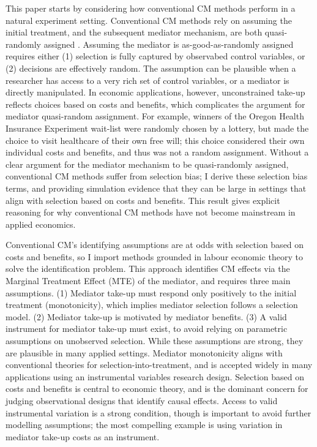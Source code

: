 This paper starts by considering how conventional CM methods perform in a natural experiment setting.
Conventional CM methods rely on assuming the initial treatment, and the subsequent mediator mechanism, are both quasi-randomly assigned \citep{imai2010identification}.
Assuming the mediator is as-good-as-randomly assigned requires either (1) selection is fully captured by observabed control variables, or (2) decisions are effectively random.
The assumption can be plausible when a researcher has access to a very rich set of control variables, or a mediator is directly manipulated.
In economic applications, however, unconstrained take-up reflects choices based on costs and benefits, which complicates the argument for mediator quasi-random assignment.
For example, winners of the Oregon Health Insurance Experiment wait-list were randomly chosen by a lottery, but made the choice to visit healthcare of their own free will; this choice considered their own individual costs and benefits, and thus was not a random assignment.
Without a clear argument for the mediator mechanism to be quasi-randomly assigned, conventional CM methods suffer from selection bias; I derive these selection bias terms, and providing simulation evidence that they can be large in settings that align with selection based on costs and benefits.
This result gives explicit reasoning for why conventional CM methods have not become mainstream in applied economics. 

Conventional CM's identifying assumptions are at odds with selection based on costs and benefits, so I import methods grounded in labour economic theory to solve the identification problem.
This approach identifies CM effects via the Marginal Treatment Effect (MTE) of the mediator, and requires three main assumptions.
(1) Mediator take-up must respond only positively to the initial treatment (monotonicity), which implies mediator selection follows a selection model.
(2) Mediator take-up is motivated by mediator benefits.
(3) A valid instrument for mediator take-up must exist, to avoid relying on parametric assumptions on unobserved selection.
While these assumptions are strong, they are plausible in many applied settings.
Mediator monotonicity aligns with conventional theories for selection-into-treatment, and is accepted widely in many applications using an instrumental variables research design.
Selection based on costs and benefits is central to economic theory, and is the dominant concern for judging observational designs that identify causal effects.
Access to valid instrumental variation is a strong condition, though is important to avoid further modelling assumptions; the most compelling example is using variation in mediator take-up costs as an instrument.

